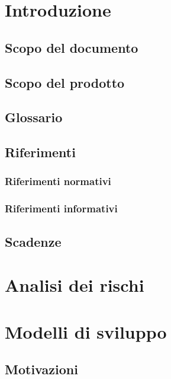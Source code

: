 \documentclass[a4paper, oneside, openany, dvipsnames, table]{article}
\begin{document}
\copertina{}


\newpage
\tableofcontents
\newpage

\section{Introduzione}
	\subsection{Scopo del documento}
		
	\subsection{Scopo del prodotto}
		
	\subsection{Glossario}
		
	\subsection{Riferimenti}
		\subsubsection{Riferimenti normativi}
			
		\subsubsection{Riferimenti informativi}
		\label{sec:RifInf}
			
	\subsection{Scadenze}
		
\newpage
\section{Analisi dei rischi}
	\label{sec:rischi}
	
	\newpage
	
\newpage
\section{Modelli di sviluppo}
	
	\subsection{Motivazioni}
		
\newpage
\end{document}
